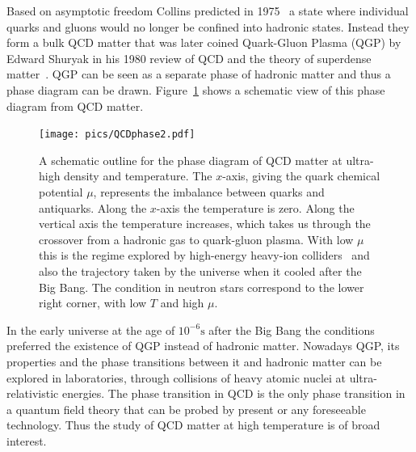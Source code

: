 
Based on asymptotic freedom Collins predicted in 1975~\cite{Collins:1975} a state where individual quarks and gluons would no longer be confined into hadronic states. Instead they form a bulk QCD matter that was later coined Quark-Gluon Plasma (QGP) by Edward Shuryak in his 1980 review of QCD and the theory of superdense matter~\cite{Shuryak:1980}. QGP can be seen as a separate phase of hadronic matter and thus a phase diagram can be drawn. Figure~\ref{fig:QCDphase} shows a schematic view of this phase diagram from QCD matter.

\begin{figure}[htb]
\centering
\texttt{[image: pics/QCDphase2.pdf]}
\caption[QCD phase diagram]{A schematic outline for the phase diagram of QCD matter at ultra-high density and temperature. The $x$-axis, giving the quark chemical potential $\mu$, represents the imbalance between quarks and antiquarks. Along the $x$-axis the temperature is zero. Along the vertical axis the temperature increases, which takes us through the crossover from a hadronic gas to quark-gluon plasma. With low $\mu$ this is the regime explored by high-energy heavy-ion colliders~\cite{Rajagopal:2001} and also the trajectory taken by the universe when it cooled after the Big Bang. The condition in neutron stars correspond to the lower right corner, with low $T$ and high $\mu$.}
\label{fig:QCDphase}
\end{figure}


In the early universe at the age of $10^{-6}\mathrm{s}$ after the Big Bang the conditions preferred the existence of QGP instead of hadronic matter. Nowadays QGP, its properties and the phase transitions between it and hadronic matter can be explored in laboratories, through collisions of heavy atomic nuclei at ultra-relativistic energies. The phase transition in QCD is the only phase transition in a quantum field theory that can be probed by present or any foreseeable technology. Thus the study of QCD matter at high temperature is of broad interest.

